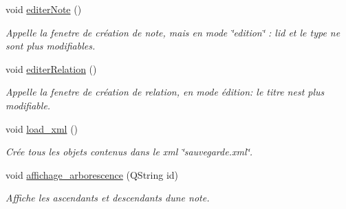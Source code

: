 \begin{DoxyCompactItemize}
void \hyperlink{class_fen_principale_ab8b916f06d0c149b1411781e7129fab5}{editer\+Note} ()
\begin{DoxyCompactList}\small\item\em Appelle la fenetre de création de note, mais en mode \char`\"{}edition\char`\"{} \+: l\textquotesingle{}id et le type ne sont plus modifiables. \end{DoxyCompactList}\item 
\mbox{\label{class_fen_principale_a03e9dfdb793047a0ff1a360324d3a251}} 
void \hyperlink{class_fen_principale_a03e9dfdb793047a0ff1a360324d3a251}{editer\+Relation} ()
\begin{DoxyCompactList}\small\item\em Appelle la fenetre de création de relation, en mode édition\+: le titre n\textquotesingle{}est plus modifiable. \end{DoxyCompactList}\item 
\mbox{\label{class_fen_principale_a60879a209bf90971f1919a685c9538dd}} 
void \hyperlink{class_fen_principale_a60879a209bf90971f1919a685c9538dd}{load\+\_\+xml} ()
\begin{DoxyCompactList}\small\item\em Crée tous les objets contenus dans le xml \char`\"{}sauvegarde.\+xml\char`\"{}. \end{DoxyCompactList}\item 
void \hyperlink{class_fen_principale_adf2a7193704aaf0b73b5b10b3133488c}{affichage\+\_\+arborescence} (Q\+String id)
\begin{DoxyCompactList}\small\item\em Affiche les ascendants et descendants d\textquotesingle{}une note. \end{DoxyCompactList}\end{DoxyCompactItemize}
